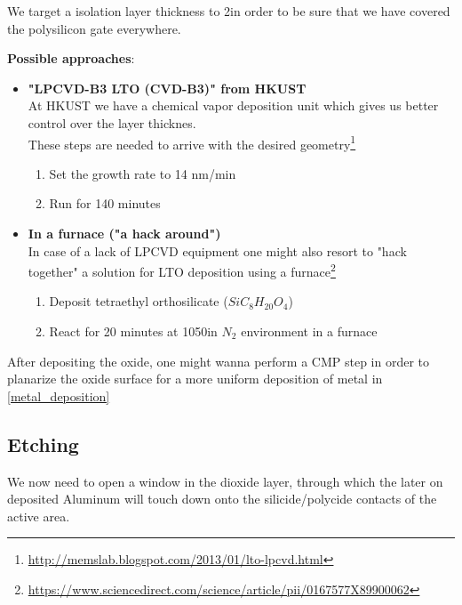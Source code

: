 We target a isolation layer thickness to 2\um in order to be sure that we have covered the polysilicon gate everywhere.

\textbf{Possible approaches}:
\begin{itemize}
	\item \textbf{"LPCVD-B3 LTO (CVD-B3)" from HKUST} \\
	At HKUST we have a chemical vapor deposition unit which gives us better control over the layer thicknes. \\
	These steps are needed to arrive with the desired geometry\footnote{\url{http://memslab.blogspot.com/2013/01/lto-lpcvd.html}}
	\begin{enumerate}
		\item Set the growth rate to 14 nm/min
		\item Run for 140 minutes
	\end{enumerate}
	\item \textbf{In a furnace ("a hack around")} \\
	In case of a lack of LPCVD equipment one might also resort to "hack together" a solution for LTO deposition using a furnace\footnote{\url{https://www.sciencedirect.com/science/article/pii/0167577X89900062}}
		\begin{enumerate}
			\item Deposit tetraethyl orthosilicate ($Si C_8 H_{20} O_4$)
			\item React for 20 minutes at 1050\degreesC in $N_2$ environment in a furnace
	\end{enumerate}
\end{itemize}

After depositing the oxide, one might wanna perform a CMP step in order to planarize the oxide surface for a more uniform deposition of metal in \autoref{metal_deposition}

\newpage

\subsection{Etching}\label{contact_holes_etch}

We now need to open a window in the dioxide layer, through which the later on deposited Aluminum will touch down onto the silicide/polycide contacts of the active area.

